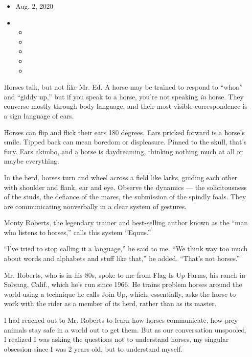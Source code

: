 \begin{itemize}
\item
  Aug. 2, 2020
\item
  \begin{itemize}
  \item
  \item
  \item
  \item
  \item
  \end{itemize}
\end{itemize}

Horses talk, but not like Mr. Ed. A horse may be trained to respond to
``whoa'' and ``giddy up,'' but if you speak to a horse, you're not
speaking \emph{in} horse. They converse mostly through body language,
and their most visible correspondence is a sign language of ears.

Horses can flip and flick their ears 180 degrees. Ears pricked forward
is a horse's smile. Tipped back can mean boredom or displeasure. Pinned
to the skull, that's fury. Ears akimbo, and a horse is daydreaming,
thinking nothing much at all or maybe everything.

In the herd, horses turn and wheel across a field like larks, guiding
each other with shoulder and flank, ear and eye. Observe the dynamics
--- the solicitousness of the studs, the defiance of the mares, the
submission of the spindly foals. They are communicating nonverbally in a
clear system of gestures.

Monty Roberts, the legendary trainer and best-selling author known as
the ``man who listens to horses,'' calls this system ``Equus.''

``I've tried to stop calling it a language,'' he said to me. ``We think
way too much about words and alphabets and stuff like that,'' he added.
``That's not horses.''

Mr. Roberts, who is in his 80s, spoke to me from Flag Is Up Farms, his
ranch in Solvang, Calif., which he's run since 1966. He trains problem
horses around the world using a technique he calls Join Up, which,
essentially, asks the horse to work with the rider as a member of its
herd, rather than as its master.

I had reached out to Mr. Roberts to learn how horses communicate, how
prey animals stay safe in a world out to get them. But as our
conversation unspooled, I realized I was asking the questions not to
understand horses, my singular obsession since I was 2 years old, but to
understand myself.

